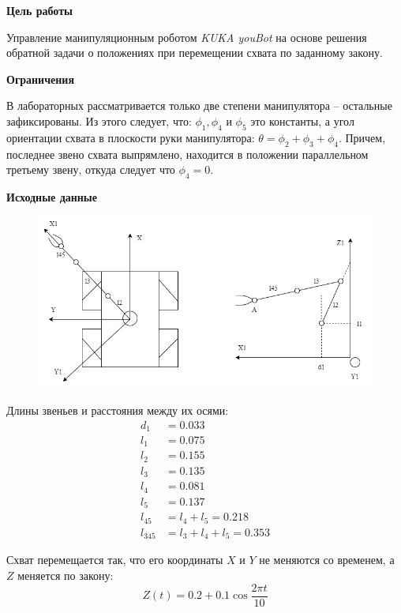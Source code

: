 
\textbf{Цель работы} 

Управление манипуляционным роботом \textit{KUKA youBot} на основе решения обратной задачи о положениях при перемещении схвата по заданному закону.

\textbf{Ограничения}

В лабораторных рассматривается только две степени манипулятора -- остальные зафиксированы. Из этого следует, что: $ \phi_1, \phi_4 $ и $ \phi_5 $ это константы, а угол ориентации схвата в плоскости руки манипулятора: $\theta = \phi_2+\phi_3+\phi_4$. Причем, последнее звено схвата выпрямлено, находится в положении параллельном третьему звену, откуда следует что $ \phi_4=0 $.

\textbf{Исходные данные}

\begin{figure}[ht!]
    \includegraphics[width=1.0\textwidth]{chapter_intro/figure1.png}
\end{figure}

Длины звеньев и расстояния между их осями:
\begin{align*}
    d_1 &= 0.033 \\
    l_1 &= 0.075 \\
    l_2 &= 0.155 \\
    l_3 &= 0.135 \\
    l_4 &= 0.081 \\
    l_5 &= 0.137 \\
    l_{45} &= l_4+l_5 = 0.218 \\
    l_{345} &= l_3 + l_4 + l_5 = 0.353
\end{align*}

Схват перемещается так, что его координаты $X$ и $Y$ не меняются со временем, а $Z$ меняется по закону:
$$ Z(t) = 0.2 + 0.1 \cos \frac{2 \pi t}{10} $$

